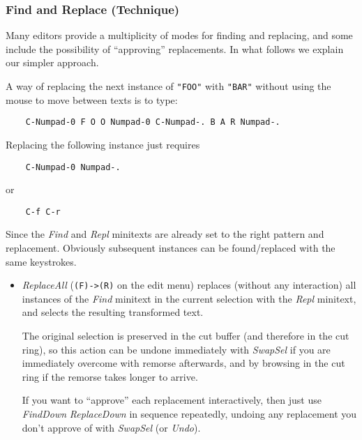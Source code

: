 \documentclass[12pt,a4paper]{article}
\begin{document}
\hypertarget{find-and-replace-technique}{%
\subsubsection{Find and Replace
(Technique)}\label{find-and-replace-technique}}

Many editors provide a multiplicity of modes for finding and replacing,
and some include the possibility of ``approving'' replacements. In what
follows we explain our simpler approach.

A way of replacing the next instance of \texttt{"FOO"} with
\texttt{"BAR"} without using the mouse to move between texts is to type:

\begin{verbatim}
    C-Numpad-0 F O O Numpad-0 C-Numpad-. B A R Numpad-.
\end{verbatim}

Replacing the following instance just requires

\begin{verbatim}
    C-Numpad-0 Numpad-.
\end{verbatim}

or

\begin{verbatim}
    C-f C-r
\end{verbatim}

Since the \emph{Find} and \emph{Repl} minitexts are already set to the
right pattern and replacement. Obviously subsequent instances can be
found/replaced with the same keystrokes.

\begin{itemize}
\item
  \emph{ReplaceAll} (\texttt{(F)-\textgreater{}(R)} on the edit menu)
  replaces (without any interaction) all instances of the \emph{Find}
  minitext in the current selection with the \emph{Repl} minitext, and
  selects the resulting transformed text.

  The original selection is preserved in the cut buffer (and therefore
  in the cut ring), so this action can be undone immediately with
  \emph{SwapSel} if you are immediately overcome with remorse
  afterwards, and by browsing in the cut ring if the remorse takes
  longer to arrive.

  If you want to ``approve'' each replacement interactively, then just
  use \emph{FindDown} \emph{ReplaceDown} in sequence repeatedly, undoing
  any replacement you don't approve of with \emph{SwapSel} (or
  \emph{Undo}).
\end{itemize}
\end{document}
